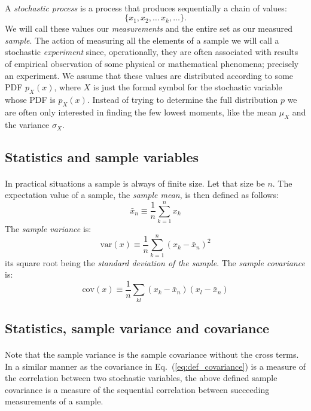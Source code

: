 \documentclass[%
oneside,                 %
final,                   %
10pt]{article}
\begin{document}
\paragraph{}
A \emph{stochastic process} is a process that produces sequentially a
chain of values:
\[
\{x_1, x_2,\dots\,x_k,\dots\}.
\]
We will call these
values our \emph{measurements} and the entire set as our measured
\emph{sample}.  The action of measuring all the elements of a sample
we will call a stochastic \emph{experiment} since, operationally,
they are often associated with results of empirical observation of
some physical or mathematical phenomena; precisely an experiment. We
assume that these values are distributed according to some 
PDF $p_X^{\phantom X}(x)$, where $X$ is just the formal symbol for the
stochastic variable whose PDF is $p_X^{\phantom X}(x)$. Instead of
trying to determine the full distribution $p$ we are often only
interested in finding the few lowest moments, like the mean
$\mu_X^{\phantom X}$ and the variance $\sigma_X^{\phantom X}$.




\subsection*{Statistics and sample variables}

\paragraph{}
In practical situations a sample is always of finite size. Let that
size be $n$. The expectation value of a sample, the \emph{sample mean}, is then defined as follows:
\[
\bar{x}_n \equiv \frac{1}{n}\sum_{k=1}^n x_k
\]
The \emph{sample variance} is:
\[
\mathrm{var}(x) \equiv \frac{1}{n}\sum_{k=1}^n (x_k - \bar{x}_n)^2
\]
its square root being the \emph{standard deviation of the sample}. The
\emph{sample covariance} is:
\[
\mathrm{cov}(x)\equiv\frac{1}{n}\sum_{kl}(x_k - \bar{x}_n)(x_l - \bar{x}_n)
\]



\subsection*{Statistics, sample variance and covariance}

\paragraph{}
Note that the sample variance is the sample covariance without the
cross terms. In a similar manner as the covariance in Eq.~(\ref{eq:def_covariance}) is a measure of the correlation between
two stochastic variables, the above defined sample covariance is a
measure of the sequential correlation between succeeding measurements
of a sample.
\end{document}
